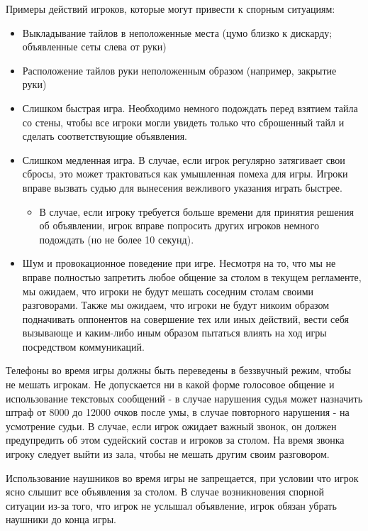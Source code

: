 Примеры действий игроков, которые могут привести к спорным ситуациям:
\begin{itemize}
	\item Выкладывание тайлов в неположенные места (цумо близко к дискарду; объявленные сеты слева от руки)
	\item Расположение тайлов руки неположенным образом (например, закрытие руки)
	\item Слишком быстрая игра. Необходимо немного подождать перед взятием тайла со стены, чтобы все игроки могли увидеть только что сброшенный тайл и сделать соответствующие объявления.
	\item Слишком медленная игра. В случае, если игрок регулярно затягивает свои сбросы, это может трактоваться как умышленная помеха для игры. Игроки вправе вызвать судью для вынесения вежливого указания играть быстрее.
	\begin{itemize}
		\item В случае, если игроку требуется больше времени для принятия решения об объявлении, игрок вправе попросить других игроков немного подождать (но не более 10 секунд).
	\end{itemize}
	\item Шум и провокационное поведение при игре. Несмотря на то, что мы не вправе полностью запретить любое общение за столом в текущем регламенте, мы ожидаем, что игроки не будут мешать соседним столам своими разговорами. Также мы ожидаем, что игроки не будут никоим образом подначивать оппонентов на совершение тех или иных действий, вести себя вызывающе и каким-либо иным образом пытаться влиять на ход игры посредством коммуникаций.
\end{itemize}

Телефоны во время игры должны быть переведены в беззвучный режим, чтобы не мешать игрокам. Не допускается ни в какой форме голосовое общение и использование текстовых сообщений - в случае нарушения судья может назначить штраф от 8000 до 12000 очков после умы, в случае повторного нарушения - на усмотрение судьи. В случае, если игрок ожидает важный звонок, он должен предупредить об этом судейский состав и игроков за столом. На время звонка игроку следует выйти из зала, чтобы не мешать другим своим разговором.

Использование наушников во время игры не запрещается, при условии что игрок ясно слышит все объявления за столом. В случае возникновения спорной ситуации из-за того, что игрок не услышал объявление, игрок обязан убрать наушники до конца игры.

